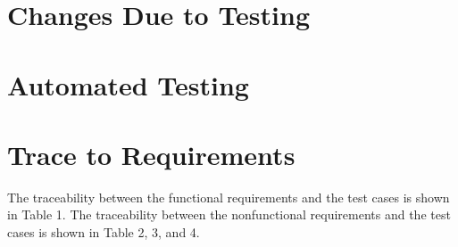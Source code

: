 \documentclass[12pt, titlepage]{article}
\begin{document}
\section{Changes Due to Testing}


\section{Automated Testing}
		
\section{Trace to Requirements}
The traceability between the functional requirements and the test cases is shown in Table 1. The traceability between the nonfunctional requirements and the test cases is shown in Table 2, 3, and 4. 
\end{document}
